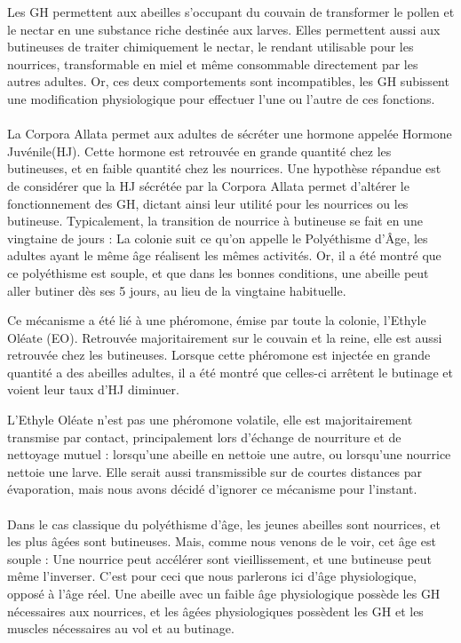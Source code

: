 			Les GH permettent aux abeilles s'occupant du couvain de transformer le pollen et le nectar en une substance riche destinée aux larves. Elles permettent aussi aux butineuses de traiter chimiquement le nectar, le rendant utilisable pour les nourrices, transformable en miel et même consommable directement par les autres adultes. Or, ces deux comportements sont incompatibles, les GH subissent une modification physiologique pour effectuer l'une ou l'autre de ces fonctions.
			
			\paragraph{}
			La Corpora Allata permet aux adultes de sécréter une hormone appelée Hormone Juvénile(HJ). Cette hormone est retrouvée en grande quantité chez les butineuses, et en faible quantité chez les nourrices. Une hypothèse répandue est de considérer que la HJ sécrétée par la Corpora Allata permet d'altérer le fonctionnement des GH, dictant ainsi leur utilité pour les nourrices ou les butineuse. Typicalement, la transition de nourrice à butineuse se fait en une vingtaine de jours : La colonie suit ce qu'on appelle le Polyéthisme d'Âge, les adultes ayant le même âge réalisent les mêmes activités. Or, il a été montré que ce polyéthisme est souple, et que dans les bonnes conditions, une abeille peut aller butiner dès ses 5 jours, au lieu de la vingtaine habituelle.
			
			Ce mécanisme a été lié à une phéromone, émise par toute la colonie, l'Ethyle Oléate (EO). Retrouvée majoritairement sur le couvain et la reine, elle est aussi retrouvée chez les butineuses. Lorsque cette phéromone est injectée en grande quantité a des abeilles adultes, il a été montré que celles-ci arrêtent le butinage et voient leur taux d'HJ diminuer.
			
			L'Ethyle Oléate n'est pas une phéromone volatile, elle est majoritairement transmise par contact, principalement lors d'échange de nourriture et de nettoyage mutuel : lorsqu'une abeille en nettoie une autre, ou lorsqu'une nourrice nettoie une larve. Elle serait aussi transmissible sur de courtes distances par évaporation, mais nous avons décidé d'ignorer ce mécanisme pour l'instant.
			
			
			\paragraph{}
			Dans le cas classique du polyéthisme d'âge, les jeunes abeilles sont nourrices, et les plus âgées sont butineuses. Mais, comme nous venons de le voir, cet âge est souple : Une nourrice peut accélérer sont vieillissement, et une butineuse peut même l'inverser. C'est pour ceci que nous parlerons ici d'âge physiologique, opposé à l'âge réel. Une abeille avec un faible âge physiologique possède les GH nécessaires aux nourrices, et les âgées physiologiques possèdent les GH et les muscles nécessaires au vol et au butinage. 
			
